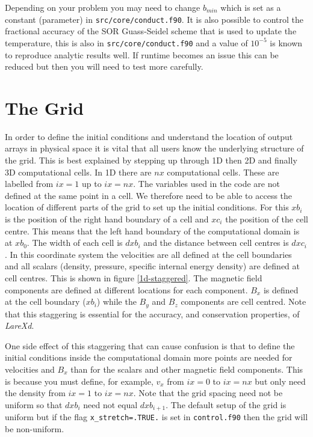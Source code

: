 \documentclass[11pt]{article}
\begin{document}
Depending on your problem you may need to change $b_{min}$ which is set as a constant (parameter) in {\tt src/core/conduct.f90}. It is also possible to control the fractional accuracy of the SOR Guass-Seidel scheme that is used to update the temperature, this is also in {\tt src/core/conduct.f90} and a value of $10^{-5}$ is known to reproduce analytic results well. If runtime becomes an issue this can be reduced but then you will need to test more carefully.


\section{The Grid}
In order to define the initial conditions and understand the location of output arrays in physical space it is vital that all users know the underlying structure of the grid. This is best explained by stepping up through 1D then 2D and finally 3D computational cells. In 1D there are $nx$ computational cells. These are labelled from $ix=1$ up to $ix=nx$. The variables used in the code are not defined at the same point in a cell. We therefore need to be able to access the location of different parts of the grid to set up the initial conditions. For this $xb_i$ is the position of the right hand boundary of a cell and $xc_i$ the position of the cell centre. This means that the left hand boundary of the computational domain is at $xb_0$. The width of each cell is $dxb_i$ and the distance between cell centres is $dxc_i$. In this coordinate system the velocities are all defined at the cell boundaries and all scalars (density, pressure, specific internal energy density) are defined at cell centres. This is shown in figure \ref{1d-staggered}. The magnetic field components are defined at different locations for each component. $B_x$ is defined at the cell boundary ($xb_i$) while the $B_y$ and $B_z$ components are cell centred. Note that this staggering is essential for the accuracy, and conservation properties, of {\it LareXd}. 

One side effect of this staggering that can cause confusion is that to define the initial conditions inside the computational domain more points are needed for velocities and $B_x$ than for the scalars and other magnetic field components. This is because you must define, for example, $v_x$ from $ix=0$ to $ix=nx$ but only need the density from $ix=1$ to $ix=nx$. Note that the grid spacing need not be uniform so that $dxb_i$ need not equal $dxb_{i+1}$. The default setup of the grid is uniform but if the flag \texttt{x\_stretch=.TRUE.} is set in \texttt{control.f90} then the grid will be non-uniform. 
\end{document}
